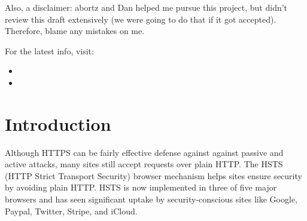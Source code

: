 \documentclass{acm_proc_article-sp}
\begin{document}
Also, a disclaimer: abortz and Dan helped me pursue this project, but didn't review this draft extensively (we were going to do that if it got accepted). Therefore, blame any mistakes on me.

For the latest info, visit:

\begin{itemize}
\item {}
\item {}
\end{itemize}


\section{Introduction}
\label{sec:intro}

Although HTTPS can be fairly effective defense against against passive and active attacks, many sites still accept requests over plain HTTP. The HSTS (HTTP Strict Transport Security) browser mechanism helps sites ensure security by avoiding plain HTTP. HSTS is now implemented in three of five major browsers and has seen significant uptake by security-conscious sites like Google, Paypal, Twitter, Stripe, and iCloud.
\end{document}
